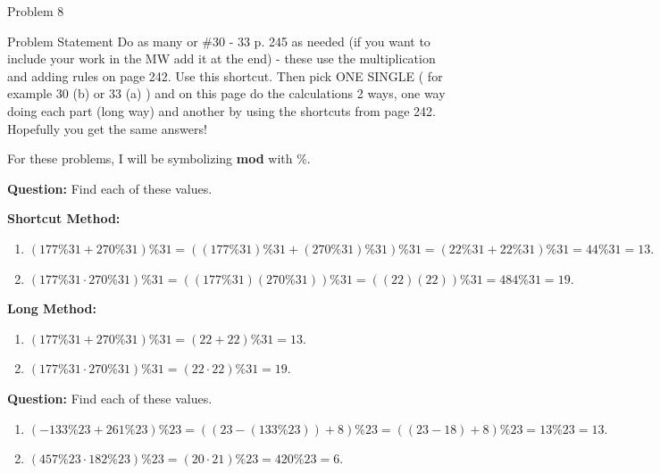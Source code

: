 \begin{problem}{Problem 8}
    \begin{statement}{Problem Statement}
        Do as many or \#30 - 33 p. 245 as needed (if you want to include your work in the MW add it at the end)  - these use the multiplication and adding rules on page 242. Use this shortcut. Then pick ONE 
        SINGLE ( for example 30 (b) or 33 (a) ) and on this page do the calculations 2 ways, one way doing each part (long way) and another by using the shortcuts from page 242. Hopefully you get the same 
        answers!
    \end{statement}

    For these problems, I will be symbolizing \textbf{mod} with \%.

    \begin{Highlight}[Solution - \#30]
        \noindent \textbf{Question:} Find each of these values. \vspace*{1em}

        \textbf{Shortcut Method:}
        \begin{enumerate}[label=(\alph*)]
            \item $(177 \% 31 + 270 \% 31) \% 31 = ((177 \% 31) \% 31 + (270 \% 31) \% 31) \% 31 = (22 \% 31 + 22 \% 31) \% 31 = 44 \% 31 = 13.$
            \item $(177 \% 31 \cdot 270 \% 31) \% 31 = ((177 \% 31)(270 \% 31)) \% 31 = ((22)(22)) \% 31 = 484 \% 31 = 19.$
        \end{enumerate}

        \textbf{Long Method:}
        \begin{enumerate}[label=(\alph*)]
            \item $(177 \% 31 + 270 \% 31) \% 31 = (22 + 22) \% 31 = 13.$
            \item $(177 \% 31 \cdot 270 \% 31) \% 31 = (22 \cdot 22) \% 31 = 19.$
        \end{enumerate}
    \end{Highlight}

    \begin{Highlight}[Solution - \#31]
        \noindent \textbf{Question:} Find each of these values.
        
        \begin{enumerate}[label=(\alph*)]
            \item $(-133 \% 23 + 261 \% 23) \% 23 = ((23 - (133 \% 23)) + 8) \% 23 = ((23 - 18) + 8) \% 23 = 13 \% 23 = 13.$
            \item $(457 \% 23 \cdot 182 \% 23) \% 23 = (20 \cdot 21) \% 23 = 420 \% 23 = 6.$
        \end{enumerate}
    \end{Highlight}


\end{problem}
